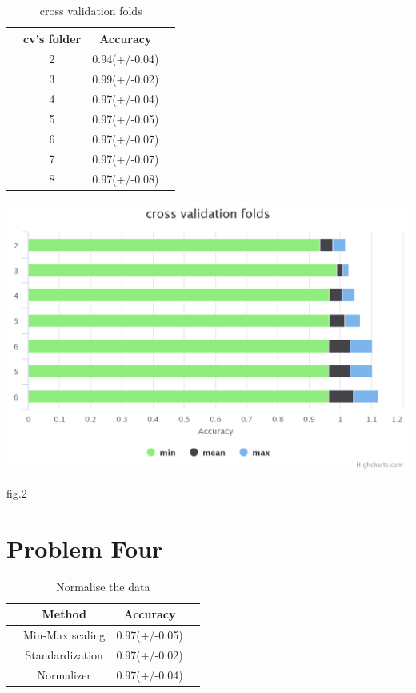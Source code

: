 \documentclass[a4pper,11pt,onecolumn]{article}
\begin{document}
\begin{table}[h]  
	\centering  
	\caption{cross validation folds}  
	\begin{tabular}{cccc} 
		\hline
		\hline
		& cv's folder & Accuracy  \\ [0.5ex] 
		\hline
		& 2 & 0.94(+/-0.04)   \\
		& 3 & 0.99(+/-0.02)  \\
		& 4 & 0.97(+/-0.04)  \\
		& 5 & 0.97(+/-0.05)  \\
		& 6 & 0.97(+/-0.07) \\
		& 7 & 0.97(+/-0.07) \\
		& 8 & 0.97(+/-0.08) \\

		\hline
		\hline
	\end{tabular}
\end{table}

\includegraphics[width=\linewidth]{cross.png}
\centerline{fig.2}

\section{Problem Four}
\begin{table}[h]  
	\centering  
	\caption{Normalise the data}  
	\begin{tabular}{cccc} 
		\hline
		\hline
		& Method & Accuracy  \\ [0.5ex] 
		\hline
		& Min-Max scaling & 0.97(+/-0.05)   \\
		& Standardization & 0.97(+/-0.02)  \\
		& Normalizer & 0.97(+/-0.04)  \\
		\hline
		\hline
	\end{tabular}
\end{table}
\end{document}
